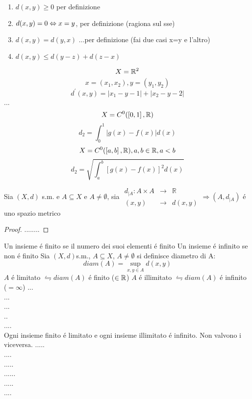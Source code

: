 	\begin{enumerate}
		\item $d(x,y)\ge 0$ per definizione
		\item $d(x,y)=0\Leftrightarrow x=y$, per definizione (ragiona sul sse) 
		\item $d(x,y)=d(y,x)$ ...per definizione (fai due casi x=y e l'altro)
		\item $d(x,y)\le d(y-z)+d(z-x)$ 
	\end{enumerate}
\example
$$X=\mathbb{R}^{2}$$
$$x=(x_1,x_2), y=(y_1,y_2)$$
$$d^{'}(x,y)=\left| x_1-y-1 \right|+\left|x_2-y-2\right|$$
...\\

\example
\example
$$X=C^0(\left[0,1\right],\mathbb{R})$$
$$d_2=\int_0^1\left|g(x)-f(x)\right|d(x)$$
\example
$$X=C^0(\left[a,b\right],\mathbb{R}), a,b\in\mathbb{R}, a<b$$
$$d_2=\sqrt{\int_a^b\left[g(x)-f(x)\right]^2d(x)}$$

\proposition
Sia $(X,d)$ s.m. e $A\subseteq X$ e $A\ne \emptyset$, sia $\begin{array}{rcl} d_{|A} : A\times A & \to & \mathbb{R} \\ (x,y) & \to & d(x,y) \end{array} \Rightarrow (A,d_{|A})$ \'e uno spazio metrico
\begin{proof}
	........
\end{proof}

Un insieme \'e finito se il numero dei suoi elementi \'e finito
Un insieme \'e infinito se non \'e finito
Sia $(X,d)$s.m., $A\subseteq X$, $A\ne \emptyset$ si definisce diametro di A: $$diam(A)=\sup\limits_{x,y\in A}d(x,y)$$
$A$ \'e limitato $\leftrightharpoons diam(A)$ \'e finito ($\in\mathbb{R}$)
$A$ \'e illimitato $\leftrightharpoons diam(A)$ \'e infinito ($=\infty$)
\example
...\\
...\\
...\\
..\\
....\\
\observation
Ogni insieme finito \'e limitato e ogni insieme illimitato \'e infinito. Non valvono i viceversa.
\example 
.....\\
....\\
.....\\
......\\
.....\\
....\\

